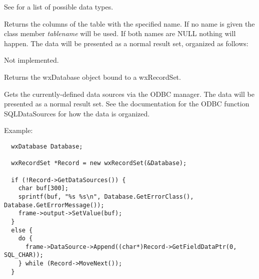 See  for a list
of possible data types.



Returns the columns of the table with the specified name. If no name is
given the class member {\it tablename} will be used. If both names are NULL
nothing will happen. The data will be presented as a normal result set, organized
as follows:

\begin{twocollist}\itemsep=0pt
\end{twocollist}



Not implemented.



Returns the wxDatabase object bound to a wxRecordSet.

\label{wxrecordsetgetdatasources}


Gets the currently-defined data sources via the ODBC manager. The data will be presented
as a normal result set. See the documentation for the ODBC function SQLDataSources for how the data
is organized.

Example:
  
\begin{verbatim}
  wxDatabase Database;

  wxRecordSet *Record = new wxRecordSet(&Database);

  if (!Record->GetDataSources()) {
    char buf[300];
    sprintf(buf, "%s %s\n", Database.GetErrorClass(), Database.GetErrorMessage());
    frame->output->SetValue(buf);
  }
  else {
    do {
      frame->DataSource->Append((char*)Record->GetFieldDataPtr(0, SQL_CHAR));
    } while (Record->MoveNext());
  }
\end{verbatim}

